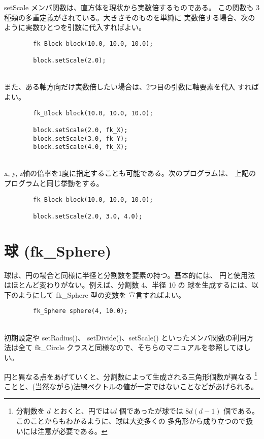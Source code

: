 setScale メンバ関数は、直方体を現状から実数倍するものである。
この関数も 3 種類の多重定義がされている。大きさそのものを単純に
実数倍する場合、次のように実数ひとつを引数に代入すればよい。
\\
\begin{screen}
\begin{verbatim}
        fk_Block block(10.0, 10.0, 10.0);

        block.setScale(2.0);
\end{verbatim}
\end{screen}
~ \\
また、ある軸方向だけ実数倍したい場合は、2つ目の引数に軸要素を代入
すればよい。
\\
\begin{breakbox}
\begin{verbatim}
        fk_Block block(10.0, 10.0, 10.0);

        block.setScale(2.0, fk_X);
        block.setScale(3.0, fk_Y);
        block.setScale(4.0, fk_X);
\end{verbatim}
\end{breakbox}
~ \\
x, y, z軸の倍率を1度に指定することも可能である。次のプログラムは、
上記のプログラムと同じ挙動をする。
\\
\begin{screen}
\begin{verbatim}
        fk_Block block(10.0, 10.0, 10.0);

        block.setScale(2.0, 3.0, 4.0);
\end{verbatim}
\end{screen}
\section{球 (fk\_Sphere)}
球は、円の場合と同様に半径と分割数を要素の持つ。基本的には、
円と使用法はほとんど変わりがない。例えば、分割数 4、半径 10 の
球を生成するには、以下のようにして fk\_Sphere 型の変数を
宣言すればよい。
\\
\begin{breakbox}
\begin{verbatim}
        fk_Sphere sphere(4, 10.0);
\end{verbatim}
\end{breakbox}
~ \\
初期設定や setRadius()、
setDivide()、setScale() といったメンバ関数の利用方法は全て
fk\_Circle クラスと同様なので、そちらのマニュアルを参照してほしい。

円と異なる点をあげていくと、分割数によって生成される三角形個数が異なる
\footnote{分割数を \(d\) とおくと、円では\(4d\) 個であったが球では
\(8d(d-1)\) 個である。このことからもわかるように、球は大変多くの
多角形から成り立つので扱いには注意が必要である。}
ことと、(当然ながら)法線ベクトルの値が一定ではないことなどがあげられる。

